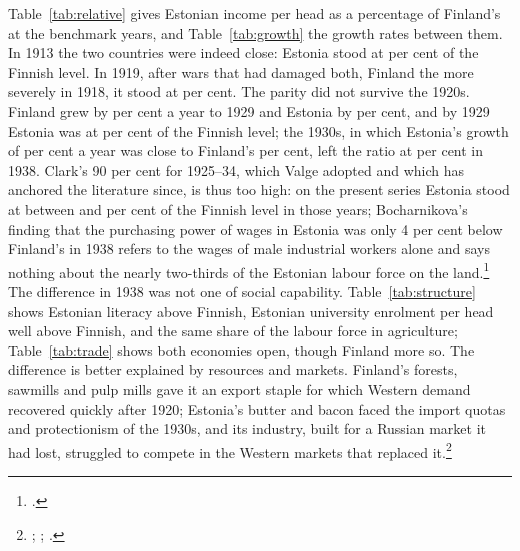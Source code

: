 Table~\ref{tab:relative} gives Estonian income per head as a percentage of Finland's at the benchmark years, and Table~\ref{tab:growth} the growth rates between them. In 1913 the two countries were indeed close: Estonia stood at  per cent of the Finnish level. In 1919, after wars that had damaged both, Finland the more severely in 1918, it stood at  per cent. The parity did not survive the 1920s. Finland grew by  per cent a year to 1929 and Estonia by  per cent, and by 1929 Estonia was at  per cent of the Finnish level; the 1930s, in which Estonia's growth of  per cent a year was close to Finland's  per cent, left the ratio at  per cent in 1938. Clark's 90 per cent for 1925--34, which Valge adopted and which has anchored the literature since, is thus too high: on the present series Estonia stood at between  and  per cent of the Finnish level in those years; Bocharnikova's finding that the purchasing power of wages in Estonia was only 4 per cent below Finland's in 1938 refers to the wages of male industrial workers alone and says nothing about the nearly two-thirds of the Estonian labour force on the land.\footnote{\autocite[81--2, 87]{bocharnikova2021}.} The difference in 1938 was not one of social capability. Table~\ref{tab:structure} shows Estonian literacy above Finnish, Estonian university enrolment per head well above Finnish, and the same share of the labour force in agriculture; Table~\ref{tab:trade} shows both economies open, though Finland more so. The difference is better explained by resources and markets. Finland's forests, sawmills and pulp mills gave it an export staple for which Western demand recovered quickly after 1920; Estonia's butter and bacon faced the import quotas and protectionism of the 1930s, and its industry, built for a Russian market it had lost, struggled to compete in the Western markets that replaced it.\footnote{\autocite[51]{finlandeh01}; \autocite[148]{kaukiainen2006}; \autocite[199--200, 203]{koll1994gap}.}

